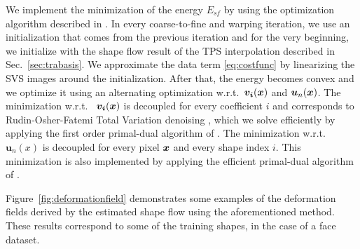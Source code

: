 We implement the minimization of the energy $E_{sf}$ by using the optimization algorithm described in \cite{Garg:2013hu}. In every coarse-to-fine and warping iteration, we use an initialization that comes from the previous iteration and for the very beginning, we initialize with the shape flow result of the TPS interpolation described in Sec.~\ref{sec:trabasis}. We approximate the data term \eqref{eq:costfunc} by linearizing the SVS images around the initialization. After that, the energy becomes convex and we optimize it using an alternating optimization w.r.t.~$\bm{v_i}(\boldsymbol{x})$ and $\bm{u}_n(\boldsymbol{x})$. The minimization w.r.t.~
$\bm{v_i}(\boldsymbol{x})$ is decoupled for every coefficient $i$ and corresponds to Rudin-Osher-Fatemi Total Variation denoising \cite{rudin92}, which we solve efficiently by applying the first order primal-dual algorithm of \cite{Chambolle:Pock:JMIV2011}. The minimization w.r.t.~
$\bm{u}_n(x)$ is decoupled for every pixel $\boldsymbol{x}$ and every shape index $i$. This minimization is also implemented by applying the efficient primal-dual algorithm of \cite{Chambolle:Pock:JMIV2011}.



Figure~\ref{fig:deformationfield} demonstrates some examples of the deformation fields derived by the estimated shape flow using the aforementioned method. These results correspond to some of the training shapes, in the case of a face dataset.






